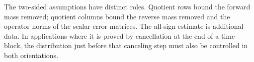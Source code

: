 The two-sided assumptions have distinct roles.  Quotient rows bound
the forward mass removed; quotient columns bound the reverse mass
removed and the operator norms of the scalar error matrices.  The
all-sign estimate is additional data.  In applications where it is
proved by cancellation at the end of a time block, the distribution
just before that canceling step must also be controlled in both
orientations.
